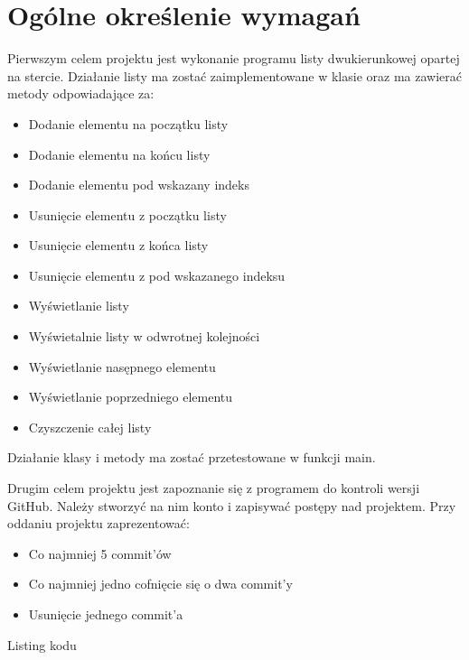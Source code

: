 	\newpage
\section{Ogólne określenie wymagań}		%













\hspace{0.60cm}Pierwszym celem projektu jest wykonanie programu listy dwukierunkowej opartej na stercie. Działanie listy ma zostać zaimplementowane w klasie oraz ma zawierać metody odpowiadające za:
\begin{itemize}
    \item Dodanie elementu na początku listy
    \item Dodanie elementu na końcu listy
    \item Dodanie elementu pod wskazany indeks
    \item Usunięcie elementu z początku listy
    \item Usunięcie elementu z końca listy
    \item Usunięcie elementu z pod wskazanego indeksu
    \item Wyświetlanie listy
    \item Wyświetalnie listy w odwrotnej kolejności
    \item Wyświetlanie nasępnego elementu
    \item Wyświetlanie poprzedniego elementu
    \item Czyszczenie całej listy
\end{itemize}
Działanie klasy i metody ma zostać przetestowane w funkcji main.

\hspace{0.60cm}Drugim celem projektu jest zapoznanie się z programem do kontroli wersji GitHub. Należy stworzyć na nim konto i zapisywać postępy nad projektem. Przy oddaniu projektu zaprezentować:
\begin{itemize}
    \item Co najmniej 5 commit'ów
    \item Co najmniej jedno cofnięcie się o dwa commit'y
    \item Usunięcie jednego commit'a
\end{itemize}

Listing kodu

